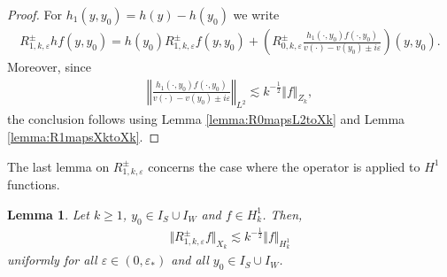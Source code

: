 \documentclass[11pt,reqno]{amsproc}
\newtheorem{lemma}[proposition]{Lemma}
\theoremstyle{definition}
\numberwithin{equation}{section}
\newcommand{\ep}{\varepsilon}
\begin{document}
\begin{proof}
For $h_1(y,y_0) = h(y) - h(y_0)$ we write 
\begin{align*}
R_{1,k,\ep}^\pm hf(y,y_0) = h(y_0) R_{1,k,\ep}^\pm f(y,y_0) + \left( R_{0,k,\ep}^\pm \frac{h_1(\cdot,y_0)f(\cdot,y_0)}{v(\cdot) - v(y_0)\pm i\ep} \right)(y,y_0).
\end{align*}	 
Moreover, since 
\begin{align*}
\left \Vert \frac{h_1(\cdot,y_0)f(\cdot,y_0)}{v(\cdot) - v(y_0)\pm i\ep} \right\Vert_{L^2}\lesssim k^{-\frac12}\Vert f \Vert_{Z_k},
\end{align*}
the conclusion follows using Lemma \ref{lemma:R0mapsL2toXk} and Lemma \ref{lemma:R1mapsXktoXk}.
\end{proof}

The last lemma on $R_{1,k,\ep}^\pm$ concerns the case where the operator is applied to $H^1$ functions. 


\begin{lemma}\label{lemma:R1mapsH1toXk}
Let $k\geq1$, $y_0\in I_S\cup I_W$ and $f\in H^1_k$. Then,
\begin{align*}
\Vert R_{1,k,\ep}^\pm f \Vert_{X_k}\lesssim k^{-\frac12}\Vert f \Vert_{H^1_k}
\end{align*}
uniformly for all $\ep\in (0,\ep_*)$ and all $y_0\in I_S\cup I_W$.
\end{lemma}
\end{document}
